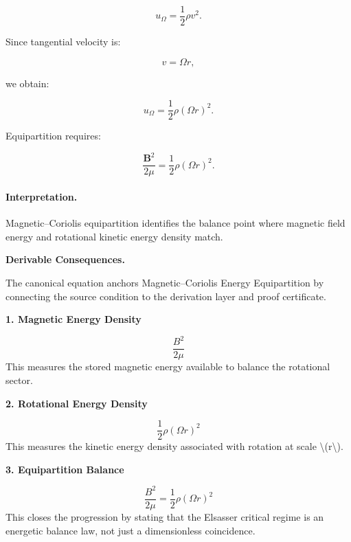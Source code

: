 \begin{equation}
u_{\Omega}
=
\frac{1}{2}\rho v^2 .
\end{equation}

Since tangential velocity is:

\begin{equation}
v=\Omega r,
\end{equation}

we obtain:

\begin{equation}
u_{\Omega}
=
\frac{1}{2}\rho(\Omega r)^2 .
\end{equation}

Equipartition requires:

\begin{equation}
\boxed{
\frac{\mathbf{B}^2}{2\mu}
=
\frac{1}{2}\rho(\Omega r)^2 .
}
\end{equation}

\paragraph{Interpretation.}
Magnetic--Coriolis equipartition identifies the balance point where magnetic field energy and rotational kinetic energy density match.

\par\vspace{0.35em}
\noindent\textbf{Derivable Consequences.}\quad
\begingroup
\footnotesize
\raggedright
The canonical equation anchors Magnetic--Coriolis Energy Equipartition by connecting the source condition to the derivation layer and proof certificate.
\par\endgroup

\noindent\textbf{1. Magnetic Energy Density}\par
\[
\frac{B^{2}}{2\mu}
\]
\noindent This measures the stored magnetic energy available to balance the rotational sector.\par
\noindent\textbf{2. Rotational Energy Density}\par
\[
\frac{1}{2}\rho(\Omega r)^{2}
\]
\noindent This measures the kinetic energy density associated with rotation at scale \textbackslash{}(r\textbackslash{}).\par
\noindent\textbf{3. Equipartition Balance}\par
\[
\frac{B^{2}}{2\mu}
=
\frac{1}{2}\rho(\Omega r)^{2}
\]
\noindent This closes the progression by stating that the Elsasser critical regime is an energetic balance law, not just a dimensionless coincidence.\par

